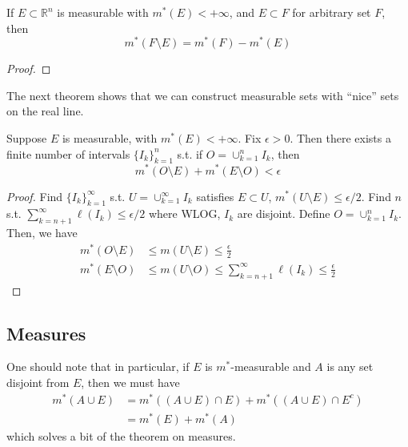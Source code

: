  \begin{lemma}
    If $E \subset \mathbb{R}^n$ is measurable with $m^\ast (E) < +\infty$, and $E \subset F$ for arbitrary set $F$, then 
    \begin{equation}
      m^\ast (F \setminus E) = m^\ast(F) - m^\ast(E)
    \end{equation}
  \end{lemma}
  \begin{proof}
    
  \end{proof}

  The next theorem shows that we can construct measurable sets with ``nice'' sets on the real line. 

  \begin{theorem}[]
    Suppose $E$ is measurable, with $m^\ast (E) < +\infty$. Fix $\epsilon > 0$. Then there exists a finite number of intervals $\{I_k\}_{k=1}^n$ s.t. if $O = \cup_{ k=1}^n I_k$, then 
    \begin{equation}
      m^\ast (O \setminus E) + m^\ast (E \setminus O) < \epsilon
    \end{equation}
  \end{theorem}
  \begin{proof}
    Find $\{I_k\}_{k=1}^\infty$ s.t. $U = \cup_{k=1}^\infty I_k$ satisfies $E \subset U$, $m^\ast (U \setminus E) \leq \epsilon/2$. Find $n$ s.t. $\sum_{k=n+1}^\infty \ell(I_k) \leq \epsilon/2$ where WLOG, $I_k$ are disjoint. Define $O = \cup_{k=1}^n I_k$. Then, we have 
    \begin{align}
      m^\ast (O \setminus E) & \leq m(U \setminus E) \leq \frac{\epsilon}{2} \\ 
      m^\ast (E \setminus O) & \leq m(U \setminus O) \leq \sum_{k=n+1}^\infty \ell(I_k) \leq \frac{\epsilon}{2}
    \end{align}
  \end{proof}

\subsection{Measures} 

  One should note that in particular, if $E$ is $m^\ast$-measurable and $A$ is any set disjoint from $E$, then we must have 
  \begin{align}
    m^\ast (A \cup E) & = m^\ast ((A \cup E) \cap E) + m^\ast ((A \cup E) \cap E^c) \\ 
                        & = m^\ast (E) + m^\ast (A)
  \end{align}
  which solves a bit of the theorem on measures. 


